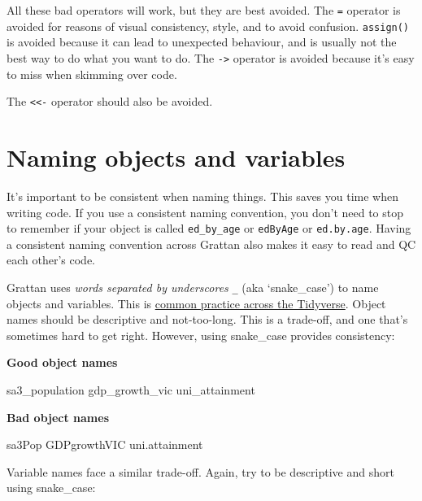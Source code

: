 \documentclass[
]{book}
\newenvironment{Shaded}{\begin{snugshade}}{\end{snugshade}}
\newcommand{\NormalTok}[1]{#1}
\begin{document}
All these bad operators will work, but they are best avoided. The \texttt{=} operator is avoided for reasons of visual consistency, style, and to avoid confusion. \texttt{assign()} is avoided because it can lead to unexpected behaviour, and is usually not the best way to do what you want to do. The \texttt{-\textgreater{}} operator is avoided because it's easy to miss when skimming over code.

The \texttt{\textless{}\textless{}-} operator should also be avoided.

\hypertarget{naming-objects-and-variables}{%
\section{Naming objects and variables}\label{naming-objects-and-variables}}

It's important to be consistent when naming things. This saves you time when writing code. If you use a consistent naming convention, you don't need to stop to remember if your object is called \texttt{ed\_by\_age} or \texttt{edByAge} or \texttt{ed.by.age}. Having a consistent naming convention across Grattan also makes it easy to read and QC each other's code.

Grattan uses \emph{words separated by underscores} \texttt{\_} (aka `snake\_case') to name objects and variables. This is \href{https://style.tidyverse.org/syntax.html\#object-names}{common practice across the Tidyverse}.
Object names should be descriptive and not-too-long. This is a trade-off, and one that's sometimes hard to get right. However, using snake\_case provides consistency:

\textbf{Good object names}

\begin{Shaded}
\begin{Highlighting}[]
\NormalTok{sa3\_population}
\NormalTok{gdp\_growth\_vic}
\NormalTok{uni\_attainment}
\end{Highlighting}
\end{Shaded}

\textbf{Bad object names}

\begin{Shaded}
\begin{Highlighting}[]
\NormalTok{sa3Pop}
\NormalTok{GDPgrowthVIC}
\NormalTok{uni.attainment}
\end{Highlighting}
\end{Shaded}

Variable names face a similar trade-off. Again, try to be descriptive and short using snake\_case:
\end{document}
